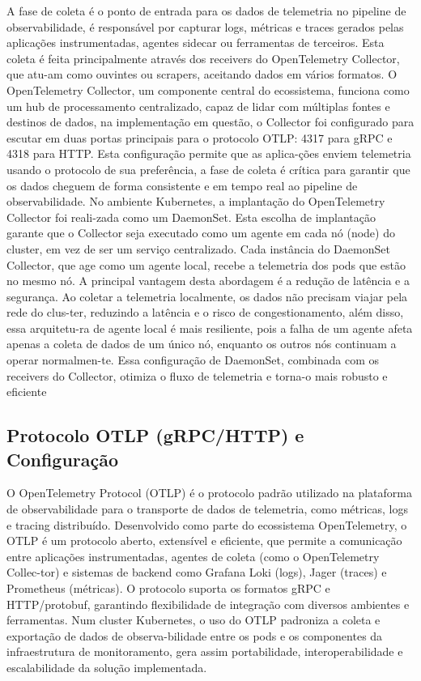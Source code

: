 A fase de coleta é o ponto de entrada para os dados de telemetria no pipeline de observabilidade, é responsável por capturar logs, métricas e traces gerados pelas aplicações instrumentadas, agentes sidecar ou ferramentas de terceiros. Esta coleta é feita principalmente através dos receivers do OpenTelemetry Collector, que atu-am como ouvintes ou scrapers, aceitando dados em vários formatos.
O OpenTelemetry Collector, um componente central do ecossistema, funciona como um hub de processamento centralizado, capaz de lidar com múltiplas fontes e destinos de dados, na implementação em questão, o Collector foi configurado para escutar em duas portas principais para o protocolo OTLP:
4317 para gRPC e 4318 para HTTP. Esta configuração permite que as aplica-ções enviem telemetria usando o protocolo de sua preferência, a fase de coleta é crítica para garantir que os dados cheguem de forma consistente e em tempo real ao pipeline de observabilidade.
No ambiente Kubernetes, a implantação do OpenTelemetry Collector foi reali-zada como um DaemonSet. Esta escolha de implantação garante que o Collector seja executado como um agente em cada nó (node) do cluster, em vez de ser um serviço centralizado. Cada instância do DaemonSet Collector, que age como um agente local, recebe a telemetria dos pods que estão no mesmo nó.
A principal vantagem desta abordagem é a redução de latência e a segurança. Ao coletar a telemetria localmente, os dados não precisam viajar pela rede do clus-ter, reduzindo a latência e o risco de congestionamento, além disso, essa arquitetu-ra de agente local é mais resiliente, pois a falha de um agente afeta apenas a coleta de dados de um único nó, enquanto os outros nós continuam a operar normalmen-te. Essa configuração de DaemonSet, combinada com os receivers do Collector, otimiza o fluxo de telemetria e torna-o mais robusto e eficiente

\subsection{Protocolo OTLP (gRPC/HTTP) e Configuração}

O OpenTelemetry Protocol (OTLP) é o protocolo padrão utilizado na plataforma de observabilidade para o transporte de dados de telemetria, como métricas, logs e tracing distribuído. Desenvolvido como parte do ecossistema OpenTelemetry, o OTLP é um protocolo aberto, extensível e eficiente, que permite a comunicação entre aplicações instrumentadas, agentes de coleta (como o OpenTelemetry Collec-tor) e sistemas de backend como Grafana Loki (logs), Jager (traces) e Prometheus (métricas). O protocolo suporta os formatos gRPC e HTTP/protobuf, garantindo flexibilidade de integração com diversos ambientes e ferramentas. Num cluster Kubernetes, o uso do OTLP padroniza a coleta e exportação de dados de observa-bilidade entre os pods e os componentes da infraestrutura de monitoramento, gera assim portabilidade, interoperabilidade e escalabilidade da solução implementada.

